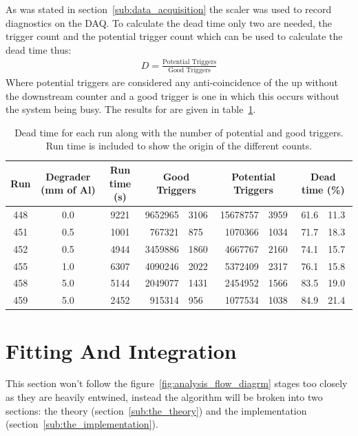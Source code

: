\documentclass[]{article}
\begin{document}
As was stated in section~\ref{sub:data_acquisition} the scaler was used to record diagnostics on the DAQ. To calculate the dead time only two are needed, the trigger count and the potential trigger count which can be used to calculate the dead time thus:
\begin{align}
    D = \frac{\text{Potential Triggers}}{\text{Good Triggers}}
\end{align}
Where potential triggers are considered any anti-coincidence of the up without the downstream counter and a good trigger is one in which this occurs without the system being busy. The results for are given in table~\ref{tab:dead_time}.
\begin{table}
    \begin{center}
    \begin{tabular}{c|c|c|r@{ $\pm$ }l|r@{ $\pm$ }l|r@{ $\pm$ }l }
        Run & Degrader (mm of Al) & Run time (s) &
                              \multicolumn{2}{|c}{Good Triggers} &      
                              \multicolumn{2}{|c}{Potential Triggers} &
                              \multicolumn{2}{|c}{Dead time (\%)} \\
        \hline
        448 & 0.0 & 9221 & 9652965 & 3106 & 15678757 & 3959 & 61.6 & 11.3 \\
        451 & 0.5 & 1001 &  767321 & 875  &  1070366 & 1034 & 71.7 & 18.3 \\
        452 & 0.5 & 4944 & 3459886 & 1860 &  4667767 & 2160 & 74.1 & 15.7 \\
        455 & 1.0 & 6307 & 4090246 & 2022 &  5372409 & 2317 & 76.1 & 15.8 \\
        458 & 5.0 & 5144 & 2049077 & 1431 &  2454952 & 1566 & 83.5 & 19.0 \\
        459 & 5.0 & 2452 &  915314 & 956  &  1077534 & 1038 & 84.9 & 21.4 \\
    \end{tabular}
    \end{center}
    \caption{Dead time for each run along with the number of potential and good triggers. Run time is included to show the origin of the different counts.}
    \label{tab:dead_time}
\end{table}

\section{Fitting And Integration} %
\label{sec:fitting_and_integration}
This section won't follow the figure~\ref{fig:analysis_flow_diagrm} stages too closely as they are heavily entwined, instead the algorithm will be broken into two sections: the theory (section~\ref{sub:the_theory}) and the implementation (section~\ref{sub:the_implementation}).
\end{document}
